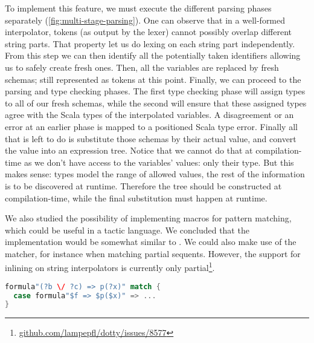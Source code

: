 To implement this feature, we must execute the different parsing phases separately (\autoref{fig:multi-stage-parsing}). One can observe that in a well-formed interpolator, tokens (as output by the lexer) cannot possibly overlap different string parts. That property let us do lexing on each string part independently. From this step we can then identify all the potentially taken identifiers allowing us to safely create fresh ones. Then, all the variables are replaced by fresh schemas; still represented as tokens at this point. Finally, we can proceed to the parsing and type checking phases. The first type checking phase will assign types to all of our fresh schemas, while the second will ensure that these assigned types agree with the Scala types of the interpolated variables. A disagreement or an error at an earlier phase is mapped to a positioned Scala type error. Finally all that is left to do is substitute those schemas by their actual value, and convert the value into an expression tree. Notice that we cannot do that at compilation-time as we don't have access to the variables' values: only their type. But this makes sense: types model the range of allowed values, the rest of the information is to be discovered at runtime. Therefore the tree should be constructed at compilation-time, while the final substitution must happen at runtime.

We also studied the possibility of implementing  macros for pattern matching, which could be useful in a tactic language. We concluded that the implementation would be somewhat similar to . We could also make use of the matcher, for instance when matching partial sequents. However, the support for inlining on string interpolators  is currently only partial\footnote{\href{https://github.com/lampepfl/dotty/issues/8577}{github.com/lampepfl/dotty/issues/8577}}.

\begin{lstlisting}[language=Scala,caption={[String interpolation unapply]{An example of the possibilities offered by unapply and string interpolators. This is not currently implemented.}},label={lst:string-interpolator-unapply}]
formula"(?b \/ ?c) => p(?x)" match {
  case formula"$f => $p($x)" => ...
}
\end{lstlisting}
